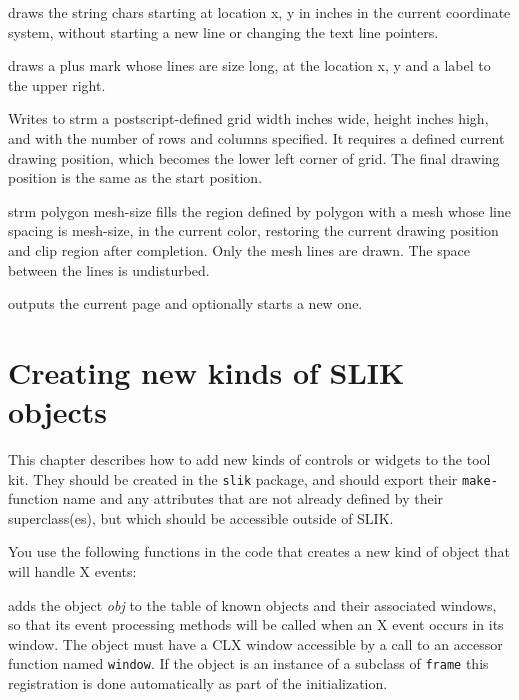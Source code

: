 \documentclass[twoside,openright,11pt]{report}
\newcommand{\tp}[1]{\texttt{#1}}
\begin{document}
{draws the string chars starting at location x, y in inches in the
current coordinate system, without starting a new line or changing the
text line pointers.}

{draws a plus mark whose lines are size long, at the location x, y and
a label to the upper right.}

{Writes to strm a postscript-defined grid width inches wide, height
inches high, and with the number of rows and columns specified. It
requires a defined current drawing position, which becomes the lower
left corner of grid.  The final drawing position is the same as the
start position.}

{strm polygon mesh-size}
{fills the region defined by polygon with a mesh whose line spacing is
mesh-size, in the current color, restoring the current drawing
position and clip region after completion.  Only the mesh lines are
drawn.  The space between the lines is undisturbed.}

{outputs the current page and optionally starts a new one.}

\chapter{Creating new kinds of SLIK objects} \label{sec:newobjs}

This chapter describes how to add new kinds of controls or widgets to
the tool kit.  They should be created in the \tp{slik} package,
and should export their \tp{make-} function name and any
attributes that are not already defined by their superclass(es), but
which should be accessible outside of SLIK.

You use the following functions in the code that creates a new kind of
object that will handle X events:

{adds the object \emph{obj} to the table of known objects and their
associated windows, so that its event processing methods will be
called when an X event occurs in its window.  The object must have a
CLX window accessible by a call to an accessor function named
\tp{window}.  If the object is an instance of a subclass of
\tp{frame} this registration is done automatically as part of the
initialization.}
\end{document}
